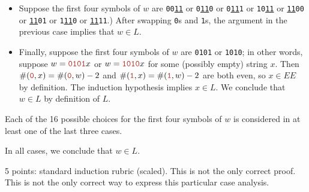 \documentclass[11pt]{article}
\def\Sym#1{\texttt{\color{BrickRed}#1}}
\begin{document}
\begin{enumerate}
\begin{enumerate}
\begin{Solution}
\begin{itemize}
\item
Suppose the first four symbols of $w$ are \Sym{00\underline{11}} or \Sym{0\underline{11}0} or \Sym{0\underline{11}1} or \Sym{10\underline{11}} or \Sym{\underline{11}00} or \Sym{\underline{11}01} or \Sym{1\underline{11}0} or \Sym{\underline{11}11}.)  After swapping \Sym0s and \Sym1s, the argument in the previous case implies that $w \in L$.

\item
Finally, suppose the first four symbols of $w$ are \Sym{0101} or \Sym{1010}; in other words, suppose $w = \Sym{0101}x$ or $w = \Sym{1010}x$ for some (possibly empty) string $x$.  Then $\#(\Sym0, x) = \#(\Sym0, w) - 2$ and $\#(\Sym1, x) = \#(\Sym1, w) - 2$ are both even, so $x\in EE$ by definition.  The induction hypothesis implies $x\in L$.  We conclude that $w \in L$ by definition of $L$.

\end{itemize}
Each of the 16 possible choices for the first four symbols of $w$ is considered in at least one of the last three cases.

In all cases, we conclude that $w \in L$.
\end{Solution}
\unskip
\begin{rubric}
5 points: standard induction rubric (scaled).  This is not the only correct proof.  This is not the only correct  way to express this particular case analysis.
\end{rubric}


\end{enumerate}



\end{enumerate}
\end{document}
